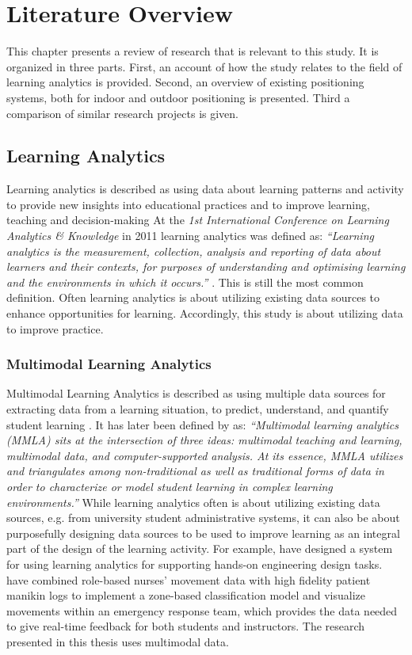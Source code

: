 \documentclass[../Main/thesis.tex]{subfiles}
\begin{document}
\chapter{Literature Overview}
\label{ch:literature_overview}
This chapter presents a review of research that is relevant to this study. %
It is organized in three parts.
First, an account of how the study relates to the field of learning analytics is provided.
Second, an overview of existing positioning systems, both for indoor and outdoor positioning is presented.
Third a comparison of similar research projects is given.

\section{Learning Analytics} 
Learning analytics is described as using data about learning patterns and activity to provide new insights into educational practices and to improve learning, teaching and decision-making \citep{Siemens2012a}
At the \textit{1st International Conference on Learning Analytics \& Knowledge} in 2011 learning analytics was defined as: \textit{``Learning analytics is the measurement, collection, analysis and reporting of data about learners and their contexts, for purposes of understanding and optimising learning and the environments in which it occurs.''} \citep{BuckinghamShum2012}.
This is still the most common definition.
Often learning analytics is about utilizing existing data sources to enhance opportunities for learning.
Accordingly, this study is about utilizing data to improve practice.

\subsection*{Multimodal Learning Analytics}
Multimodal Learning Analytics is described as using multiple data sources for extracting data from a learning situation, to predict, understand, and quantify student learning \citep{Worsley2010}.
It has later been defined by \citet{Worsley2016} as: \textit{``Multimodal learning analytics (MMLA) sits at the intersection of three ideas: multimodal teaching and learning, multimodal data, and computer-supported analysis. At its essence, MMLA utilizes and triangulates among non-traditional as well as traditional forms of data in order to characterize or model student learning in complex learning environments.''}
While learning analytics often is about utilizing existing data sources, e.g. from university student administrative systems, it can also be about purposefully designing data sources to be used to improve learning as an integral part of the design of the learning activity. 
For example, \citet{Spikol2016} have designed a system for using learning analytics for supporting hands-on engineering design tasks.
\citet{Echeverria2018} have combined role-based nurses' movement data with high fidelity patient manikin logs to implement a zone-based classification model and visualize movements within an emergency response team, which provides the data needed to give real-time feedback for both students and instructors.
The research presented in this thesis uses multimodal data.
\end{document}
